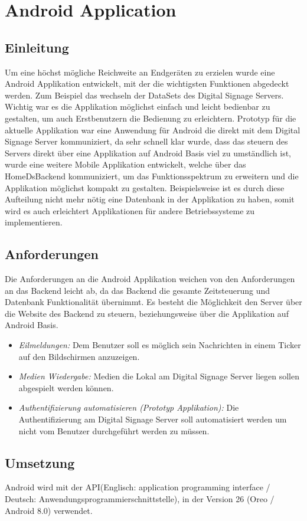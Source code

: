 \chapter{Android Application}
\section{Einleitung}
Um eine höchst mögliche Reichweite an Endgeräten zu erzielen wurde eine Android Applikation entwickelt, mit der die wichtigsten Funktionen abgedeckt werden. Zum Beispiel das wechseln der DataSets des Digital Signage Servers. Wichtig war es die Applikation möglichst einfach und leicht bedienbar zu gestalten, um auch Erstbenutzern die Bedienung zu erleichtern. 
Prototyp für die aktuelle Applikation war eine Anwendung für Android die direkt mit dem Digital Signage Server kommuniziert, da sehr schnell klar wurde, dass das steuern des Servers direkt über eine Applikation auf Android Basis viel zu umständlich ist, wurde eine weitere Mobile Applikation entwickelt, welche über das HomeDsBackend kommuniziert, um das Funktionsspektrum zu erweitern und die Applikation möglichst kompakt zu gestalten. Beispielsweise ist es durch diese Aufteilung nicht mehr nötig eine Datenbank in der Applikation zu haben, somit wird es auch erleichtert Applikationen für andere Betriebssysteme zu implementieren. 


\section{Anforderungen}
Die Anforderungen an die Android Applikation weichen von den Anforderungen an das Backend leicht ab, da das Backend die gesamte Zeitsteuerung und Datenbank Funktionalität übernimmt. Es besteht die Möglichkeit den Server über die Website des Backend zu steuern, beziehungsweise über die Applikation auf Android Basis. 

\begin{itemize}
	\item {\em Eilmeldungen:} Dem Benutzer soll es möglich sein Nachrichten in einem Ticker auf den Bildschirmen anzuzeigen.
	
	\item {\em Medien Wiedergabe:} Medien die Lokal am Digital Signage Server liegen sollen abgespielt werden können.
		
	\item {\em Authentifizierung automatisieren (Prototyp Applikation):} Die Authentifizierung am Digital Signage Server soll automatisiert werden um nicht vom Benutzer durchgeführt werden zu müssen.  
		
\end{itemize}

\section{Umsetzung}
Android wird mit der API(Englisch: application programming interface / Deutsch: Anwendungsprogrammierschnittstelle), in der Version 26 (Oreo / Android 8.0) verwendet.  
